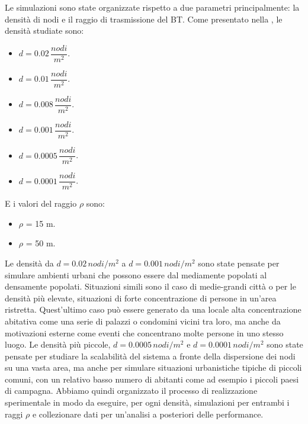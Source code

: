 Le simulazioni sono state organizzate rispetto a due parametri principalmente: la densità di nodi e il raggio di trasmissione del BT. Come presentato nella , le densità studiate sono:
\begin{itemize}
	\item $d = 0.02 \, \dfrac{nodi}{m^{2}} $.
	\item $d = 0.01 \, \dfrac{nodi}{m^{2}} $.
	\item $d = 0.008 \, \dfrac{nodi}{m^{2}} $.
	\item $d = 0.001 \, \dfrac{nodi}{m^{2}} $.
	\item $d = 0.0005 \, \dfrac{nodi}{m^{2}} $.
	\item $d = 0.0001 \, \dfrac{nodi}{m^{2}} $.
\end{itemize}
E i valori del raggio $\rho$ sono:
\begin{itemize}
	\item $\rho$ = 15 m.
	\item $\rho$ = 50 m.
\end{itemize}
Le densità da $d=0.02\,nodi/m^2$ a $d=0.001\, nodi/m^2$ sono state pensate per simulare ambienti urbani che possono essere dal mediamente popolati al densamente popolati. Situazioni simili sono il caso di medie-grandi città o per le densità più elevate, situazioni di forte concentrazione di persone in un'area ristretta. Quest'ultimo caso può essere generato da una locale alta concentrazione abitativa come una serie di palazzi o condomini vicini tra loro, ma anche da motivazioni esterne come eventi che concentrano molte persone in uno stesso luogo. Le densità più piccole, $d=0.0005\, nodi/m^2$ e $d=0.0001\, nodi/m^2$ sono state pensate per studiare la scalabilità del sistema a fronte della dispersione dei nodi su una vasta area, ma anche per simulare situazioni urbanistiche tipiche di piccoli comuni, con un relativo basso numero di abitanti come ad esempio i piccoli paesi di campagna. Abbiamo quindi organizzato il processo di realizzazione sperimentale in modo da eseguire, per ogni densità, simulazioni per entrambi i raggi $\rho$ e collezionare dati per un'analisi a posteriori delle performance.


